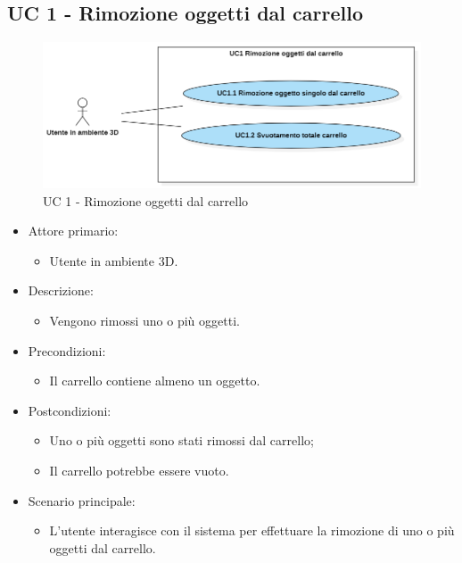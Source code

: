 \subsection{UC 1 - Rimozione oggetti dal carrello}

\begin{figure}[H]
  \renewcommand{\thefigure}{1}
  \includegraphics[width=\linewidth]{./res/images/UC1.png}
  \caption{UC 1 - Rimozione oggetti dal carrello}
  \label{fig:UC 1}
\end{figure}

\begin{itemize}
	
	\item Attore primario: 
	\begin{itemize}
		\item Utente in ambiente 3D.
	\end{itemize}
	\item Descrizione:
	\begin{itemize}
		\item Vengono rimossi uno o più oggetti.
	\end{itemize}
	
	\item Precondizioni:
	\begin{itemize}
		\item Il carrello contiene almeno un oggetto.
	\end{itemize}
	
	\item Postcondizioni:
	\begin{itemize}
		\item Uno o più oggetti sono stati rimossi dal carrello;
		\item Il carrello potrebbe essere vuoto.
	\end{itemize}
	
	\item Scenario principale:
	\begin{itemize}
		\item L'utente interagisce con il sistema per effettuare la rimozione di uno o più oggetti dal carrello.
	\end{itemize}
	
\end{itemize}


